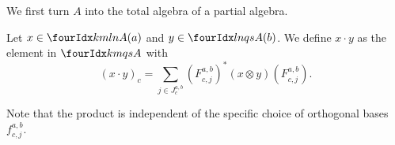 




We first turn $A$ into the total algebra of a partial algebra.

\begin{Def} Let  $x\in \Gr{A}{k}{l}{m}{n}(a)$ and $y\in \Gr{A}{l}{q}{n}{s}(b)$. We define $x\cdot y$ as the element in $\Gr{A}{k}{q}{m}{s}$ with \[(x\cdot y)_c = \sum_{j\in J^{a,b}_c} \left(F^{a,b}_{c,j}\right)^*(x\otimes y)\left( F^{a,b}_{c,j}\right).\] 

\end{Def} 
Note that the product is independent of the specific choice of orthogonal bases $f^{a,b}_{c,j}$. 

